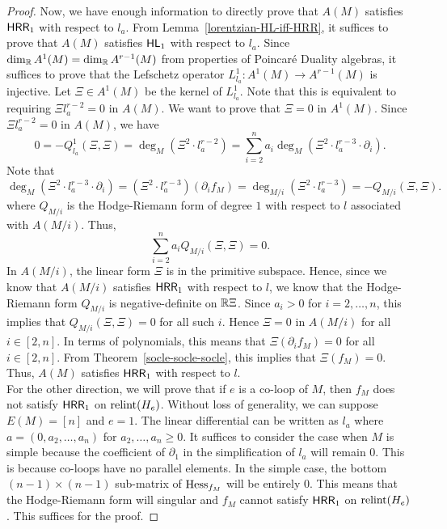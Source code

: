 \documentclass{puthesis-UG}
\begin{document}
\begin{proof}
	Now, we have enough information to directly prove that $A(M)$ satisfies $\mathsf{HRR}_1$ with respect to $l_a$. From Lemma~\ref{lorentzian-HL-iff-HRR}, it suffices to prove that $A(M)$ satisfies $\mathsf{HL}_1$ with respect to $l_a$. Since $\dim_{\mathbb{R}} A^1(M) = \dim_{\mathbb{R}} A^{r-1}(M)$ from properties of Poincar\'e Duality algebras, it suffices to prove that the Lefschetz operator $L_{l_a}^1 : A^1(M) \to A^{r-1}(M)$ is injective. Let $\Xi \in A^1(M)$ be the kernel of $L_{l_a}^1$. Note that this is equivalent to requiring $\Xi l_a^{r-2} = 0$ in $A(M)$. We want to prove that $\Xi = 0$ in $A^1(M)$. Since $\Xi l_a^{r-2} = 0$ in $A(M)$, we have 
	\[
		0 = -Q_{l_a}^1 (\Xi, \Xi) = \deg_M (\Xi^2 \cdot l_a^{r-2}) = \sum_{i = 2}^n a_i \deg_M (\Xi^2 \cdot l_a^{r-3} \cdot \partial_i).
	\]
	Note that 
	\[
		\deg_M (\Xi^2 \cdot l_a^{r-3} \cdot \partial_i) = (\Xi^2 \cdot l_a^{r-3}) (\partial_i f_M) = \deg_{M / i} (\Xi^2 \cdot l_a^{r-3}) = - Q_{M/i} (\Xi, \Xi).
	\]
	where $Q_{M/i}$ is the Hodge-Riemann form of degree $1$ with respect to $l$ associated with $A(M/i)$. Thus, 
	\[
		\sum_{i = 2}^n a_i Q_{M/i}(\Xi, \Xi) = 0.
	\]
	In $A(M/i)$, the linear form $\Xi$ is in the primitive subspace. Hence, since we know that $A(M/i)$ satisfies $\mathsf{HRR}_1$ with respect to $l$, we know that the Hodge-Riemann form $Q_{M/i}$ is negative-definite on $\mathbb{R} \Xi$. Since $a_i > 0$ for $i = 2, \ldots, n$, this implies that $Q_{M/i}(\Xi, \Xi) = 0$ for all such $i$. Hence $\Xi = 0$ in $A(M/i)$ for all $i \in [2, n]$. In terms of polynomials, this means that $\Xi (\partial_i f_M) = 0$ for all $i \in [2, n]$. From Theorem~\ref{socle-socle-socle}, this implies that $\Xi (f_M) = 0$. Thus, $A(M)$ satisfies $\mathsf{HRR}_1$ with respect to $l$. \\

	For the other direction, we will prove that if $e$ is a co-loop of $M$, then $f_M$ does not satisfy $\mathsf{HRR}_1$ on $\operatorname{relint} (H_e)$. Without loss of generality, we can suppose $E(M) = [n]$ and $e = 1$. The linear differential can be written as $l_a$ where $a = (0, a_2, \ldots, a_n)$ for $a_2, \ldots, a_n \geq 0$. It suffices to consider the case when $M$ is simple because the coefficient of $\partial_1$ in the simplification of $l_a$ will remain $0$. This is because co-loops have no parallel elements. In the simple case, the bottom $(n-1) \times (n-1)$ sub-matrix of $\operatorname{Hess}_{f_M}$ will be entirely $0$. This means that the Hodge-Riemann form will singular and $f_M$ cannot satisfy $\mathsf{HRR}_1$ on $\operatorname{relint} (H_e)$. This suffices for the proof. 
\end{proof}
\end{document}
